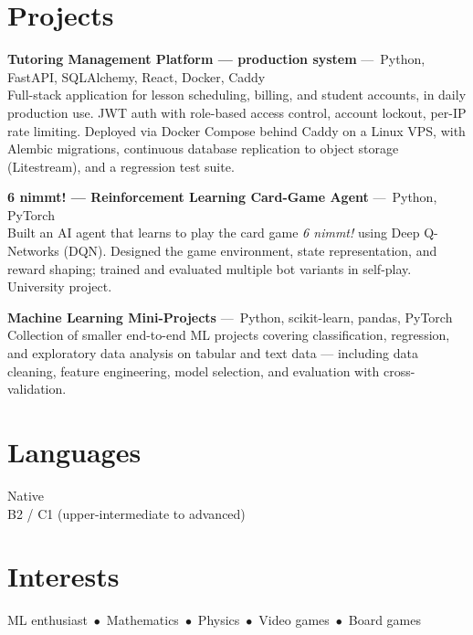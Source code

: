\documentclass[10pt, a4paper]{article}
\newcommand{\project}[3]{%
    \noindent\textbf{#1}\,\textcolor{muted}{\,---\, #2}\\[1pt]
    #3\vspace{3pt}
}
\newcommand{\skillrow}[2]{%
    \noindent\makebox[3.5cm][l]{\textbf{#1}}#2\\[2pt]
}
\begin{document}
\section*{Projects}

\project{Tutoring Management Platform --- production system}
        {Python, FastAPI, SQLAlchemy, React, Docker, Caddy}
        {Full-stack application for lesson scheduling, billing, and student accounts,
         in daily production use. JWT auth with role-based access control, account lockout,
         per-IP rate limiting. Deployed via Docker
         Compose behind Caddy on a Linux VPS, with Alembic migrations, continuous database
         replication to object storage (Litestream), and a regression test suite.}

\project{6 nimmt! — Reinforcement Learning Card-Game Agent}
        {Python, PyTorch}
        {Built an AI agent that learns to play the card game \emph{6 nimmt!} using
         Deep Q-Networks (DQN). Designed the game environment, state representation, and
         reward shaping; trained and evaluated multiple bot variants in self-play. University project.}

\project{Machine Learning Mini-Projects}
        {Python, scikit-learn, pandas, PyTorch}
        {Collection of smaller end-to-end ML projects covering classification, regression,
         and exploratory data analysis on tabular and text data --- including data cleaning,
         feature engineering, model selection, and evaluation with cross-validation.}

\section*{Languages}
\skillrow{Polish}{Native}
\skillrow{English}{B2 / C1 (upper-intermediate to advanced)}
\vspace{-12pt}

\section*{Interests}

ML enthusiast \,$\bullet$\, Mathematics \,$\bullet$\, Physics \,$\bullet$\,
Video games \,$\bullet$\, Board games
\end{document}
